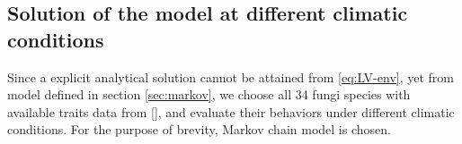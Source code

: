 \subsection{Solution of the model at different climatic conditions}

Since a explicit analytical solution cannot be attained from \eqref{eq:LV-env}, yet from model defined in section \ref{sec:markov}, we choose all 34 fungi species with available traits data from [], and evaluate their behaviors under different climatic conditions. For the purpose of brevity, Markov chain model is chosen.

